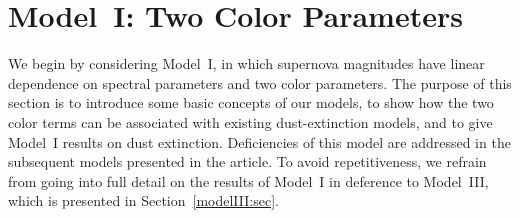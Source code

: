 \documentclass[trackchanges]{aastex62}   	%
\begin{document}
\section{Model~I: Two Color Parameters}
\label{modelI:sec}
We begin by considering Model~I, in which supernova magnitudes  have linear dependence on spectral parameters
and two color parameters. The purpose of this section is to introduce some basic concepts of our models,
to show how the two  color terms can be associated with existing dust-extinction models, and to give Model~I results on dust extinction.
Deficiencies of this model are addressed in the subsequent models presented in the article.
To avoid repetitiveness,
we refrain from going into full detail on the results of Model~I in deference to Model~III, which is presented in Section~\ref{modelIII:sec}.
\end{document}
